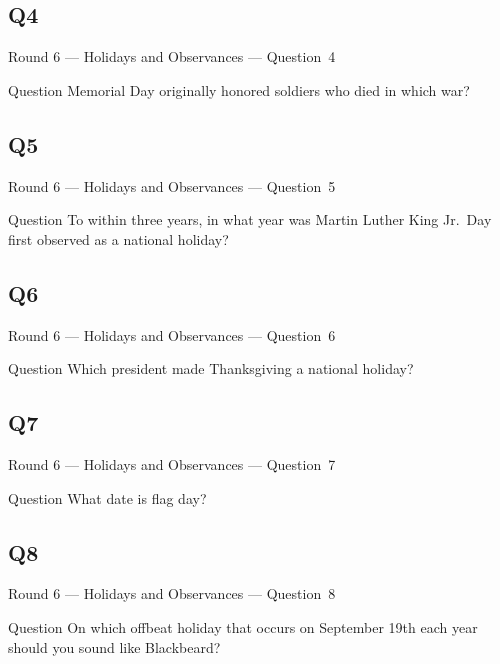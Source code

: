 \documentclass[11pt]{beamer}
\begin{document}
\subsection*{Q4}
\begin{frame}[t]{Round 6 --- Holidays and Observances --- \mbox{Question 4}}
\begin{block}{Question}
Memorial Day originally honored soldiers who died in which war?
\end{block}
\end{frame}
\subsection*{Q5}
\begin{frame}[t]{Round 6 --- Holidays and Observances --- \mbox{Question 5}}
\begin{block}{Question}
To within three years, in what year was Martin Luther King Jr.\ Day first observed as a national holiday?
\end{block}
\end{frame}
\subsection*{Q6}
\begin{frame}[t]{Round 6 --- Holidays and Observances --- \mbox{Question 6}}
\begin{block}{Question}
Which president made Thanksgiving a national holiday?
\end{block}
\end{frame}
\subsection*{Q7}
\begin{frame}[t]{Round 6 --- Holidays and Observances --- \mbox{Question 7}}
\begin{block}{Question}
What date is flag day?
\end{block}
\end{frame}
\subsection*{Q8}
\begin{frame}[t]{Round 6 --- Holidays and Observances --- \mbox{Question 8}}
\begin{block}{Question}
On which offbeat holiday that occurs on September 19th each year should you sound like Blackbeard?
\end{block}
\end{frame}
\end{document}
